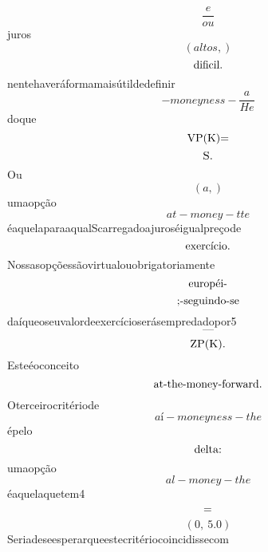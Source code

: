 \documentclass{article}
\begin{document}
\begin{equation}
\frac{e}{ou}
\end{equation}juros\begin{equation}
\left( altos,\right)
\end{equation}\begin{equation}
$dificil.$
\end{equation}nentehaveráformamaisútildedefinir\begin{equation}
- moneyness - \frac{a}{He}
\end{equation}doque\begin{equation}
$VP(K)=$
\end{equation}\begin{equation}
$S.$
\end{equation}Ou\begin{equation}
\left( a,\right)
\end{equation}umaopção\begin{equation}
at - money - tte
\end{equation}éaquelaparaaqualScarregadoajuroséigualpreçode\begin{equation}
$exercício.$
\end{equation}Nossasopçõessãovirtualouobrigatoriamente\begin{equation}
$européi-$
\end{equation}\begin{equation}
$;-seguindo-se$
\end{equation}daíqueoseuvalordeexercícioserásempredadopor5\begin{equation}
—
\end{equation}\begin{equation}
$ZP(K).$
\end{equation}Esteéoconceito\begin{equation}
$at-the-money-forward.$
\end{equation}Oterceirocritériode\begin{equation}
aí - moneyness - the
\end{equation}épelo\begin{equation}
$delta:$
\end{equation}umaopção\begin{equation}
al - money - the
\end{equation}éaquelaquetem4\begin{equation}
$=$
\end{equation}\begin{equation}
\left( 0, \  5.0\right)
\end{equation}Seriadeseesperarqueestecritériocoincidissecom\begin{equation}

\end{equation}
\end{document}
